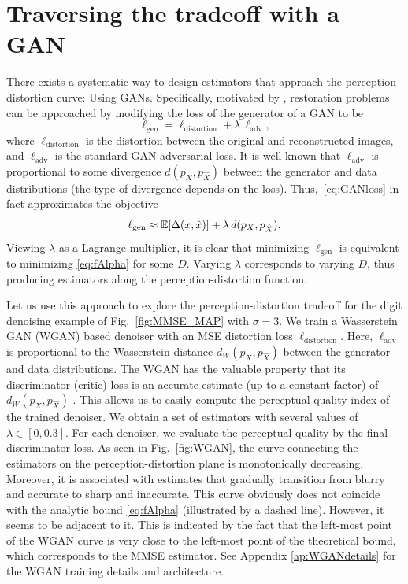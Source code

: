 \section{Traversing the tradeoff with a GAN}\label{sec:WGAN}
There exists a systematic way to design estimators that approach the perception-distortion curve: Using GANs. Specifically, motivated by \cite{ledig2016photo,pathak2016context,yeh2017semantic,sajjadi2017enhancenet,rippel2017real,isola2016image}, restoration problems can be approached by modifying the loss of the generator of a GAN to be
\begin{equation}\label{eq:GANloss}
\ell_\text{gen} = \ell_{\text{distortion}} + \lambda \, \ell_{\text{adv}},
\end{equation}
where $\ell_{\text{distortion}}$ is the distortion between the original and reconstructed images, and $\ell_{\text{adv}}$ is the standard GAN adversarial loss. It is well known that $\ell_{\text{adv}}$ is proportional to some divergence $d(p_X,p_{\hat{X}})$ between the generator and data distributions \cite{goodfellow2014generative,arjovsky2017wasserstein,nowozin2016f} (the type of divergence depends on the loss). Thus,~\eqref{eq:GANloss} in fact approximates the objective
\begin{equation}
\ell_\text{gen} \approx \mathbb{E}[\Delta(x,\hat{x})] + \lambda \, d(p_X,p_{\hat{X}}).
\end{equation}
Viewing $\lambda$ as a Lagrange multiplier, it is clear that minimizing $\ell_\text{gen}$ is equivalent to minimizing \eqref{eq:fAlpha} for some $D$. Varying $\lambda$ corresponds to varying $D$, thus producing estimators along the perception-distortion function.

Let us use this approach to explore the perception-distortion tradeoff for the digit denoising example of Fig.~\ref{fig:MMSE_MAP} with $\sigma=3$. We train a Wasserstein GAN (WGAN) based denoiser \cite{arjovsky2017wasserstein,gulrajani2017improved} with an MSE distortion loss $\ell_{\text{distortion}}$. Here, $\ell_{\text{adv}}$ is proportional to the Wasserstein distance $d_W(p_X,p_{\hat{X}})$ between the generator and data distributions. The WGAN has the valuable property that its discriminator (critic) loss is an accurate estimate (up to a constant factor) of $d_W(p_X,p_{\hat{X}})$ \cite{arjovsky2017wasserstein}. This allows us to easily compute the perceptual quality index of the trained denoiser. We obtain a set of estimators with several values of $\lambda\in[0,0.3]$. For each denoiser, we evaluate the perceptual quality by the final discriminator loss. As seen in Fig.~\ref{fig:WGAN}, the curve connecting the estimators on the perception-distortion plane is monotonically decreasing. Moreover, it is associated with estimates that gradually transition from blurry and accurate to sharp and inaccurate. This curve obviously does not coincide with the analytic bound \eqref{eq:fAlpha} (illustrated by a dashed line). However, it seems to be adjacent to it. This is indicated by the fact that the left-most point of the WGAN curve is very close to the left-most point of the theoretical bound, which corresponds to the MMSE estimator. See Appendix \ref{ap:WGANdetails} for the WGAN training details and architecture.

